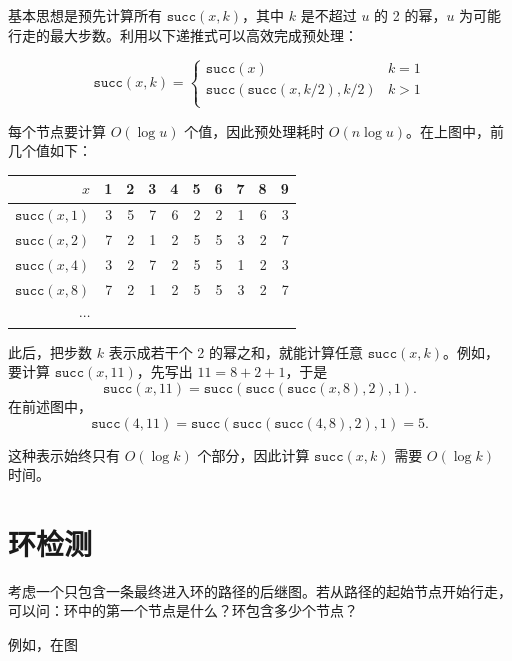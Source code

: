 基本思想是预先计算所有 $\texttt{succ}(x,k)$，其中 $k$ 是不超过 $u$ 的 2 的幂，$u$ 为可能行走的最大步数。利用以下递推式可以高效完成预处理：

\begin{equation*}
    \texttt{succ}(x,k) = \begin{cases}
               \texttt{succ}(x)              & k = 1\\
               \texttt{succ}(\texttt{succ}(x,k/2),k/2)   & k > 1\\
           \end{cases}
\end{equation*}

每个节点要计算 $O(\log u)$ 个值，因此预处理耗时 $O(n\log u)$。在上图中，前几个值如下：

\begin{center}
\begin{tabular}{r|rrrrrrrrr}
$x$ & 1 & 2 & 3 & 4 & 5 & 6 & 7 & 8 & 9 \\
\hline
$\texttt{succ}(x,1)$ & 3 & 5 & 7 & 6 & 2 & 2 & 1 & 6 & 3 \\
$\texttt{succ}(x,2)$ & 7 & 2 & 1 & 2 & 5 & 5 & 3 & 2 & 7 \\
$\texttt{succ}(x,4)$ & 3 & 2 & 7 & 2 & 5 & 5 & 1 & 2 & 3 \\
$\texttt{succ}(x,8)$ & 7 & 2 & 1 & 2 & 5 & 5 & 3 & 2 & 7 \\
$\cdots$ \\
\end{tabular}
\end{center}

此后，把步数 $k$ 表示成若干个 2 的幂之和，就能计算任意 $\texttt{succ}(x,k)$。例如，要计算 $\texttt{succ}(x,11)$，先写出 $11=8+2+1$，于是
\[\texttt{succ}(x,11)=\texttt{succ}(\texttt{succ}(\texttt{succ}(x,8),2),1).\]
在前述图中，
\[\texttt{succ}(4,11)=\texttt{succ}(\texttt{succ}(\texttt{succ}(4,8),2),1)=5.\]

这种表示始终只有 $O(\log k)$ 个部分，因此计算 $\texttt{succ}(x,k)$ 需要 $O(\log k)$ 时间。

\section{环检测}


考虑一个只包含一条最终进入环的路径的后继图。若从路径的起始节点开始行走，可以问：环中的第一个节点是什么？环包含多少个节点？

例如，在图

